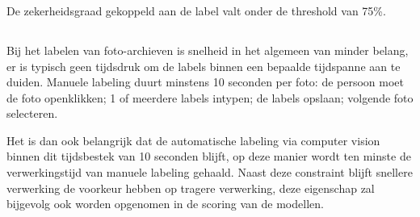 \subsubsection{}
\label{sec:zekerheidsgraad-te-laag}
De zekerheidsgraad gekoppeld aan de label valt onder de threshold van 75\%.

\subsection{}
\label{sec:scoren-of-speed}
Bij het labelen van foto-archieven is snelheid in het algemeen van minder belang, er is typisch geen tijdsdruk om de labels binnen een bepaalde tijdspanne aan te duiden. Manuele labeling duurt minstens 10 seconden per foto: de persoon moet de foto openklikken; 1 of meerdere labels intypen; de labels opslaan; volgende foto selecteren. 

Het is dan ook belangrijk dat de automatische labeling via computer vision binnen dit tijdsbestek van 10 seconden blijft, op deze manier wordt ten minste de verwerkingstijd van manuele labeling gehaald. Naast deze constraint blijft snellere verwerking de voorkeur hebben op tragere verwerking, deze eigenschap zal bijgevolg ook worden opgenomen in de scoring van de modellen.
